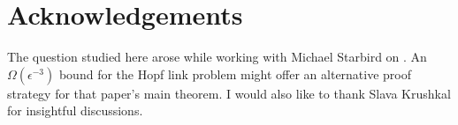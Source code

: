 \documentclass[12pt]{amsart}
\theoremstyle{definition}
\theoremstyle{remark}
\begin{document}
\section{Acknowledgements}
The question studied here arose while working with Michael Starbird on \cite{fs22}. An $\Omega(\epsilon^{-3})$ bound for the Hopf link problem might offer an alternative proof strategy for that paper's main theorem. I would also like to thank Slava Krushkal for insightful discussions.


\end{document}
